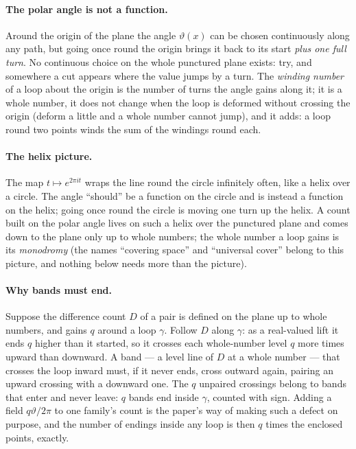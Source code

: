 \documentclass[10pt]{article}
\theoremstyle{plain}
\theoremstyle{definition}
\begin{document}
\paragraph{The polar angle is not a function.}
Around the origin of the plane the angle $\vartheta(x)$ can be chosen
continuously along any path, but going once round the origin brings it back
to its start \emph{plus one full turn}. No continuous choice on the whole
punctured plane exists: try, and somewhere a cut appears where the value
jumps by a turn. The \emph{winding number} of a loop about the origin is
the number of turns the angle gains along it; it is a whole number, it does
not change when the loop is deformed without crossing the origin (deform a
little and a whole number cannot jump), and it adds: a loop round two
points winds the sum of the windings round each.

\paragraph{The helix picture.}
The map $t\mapsto e^{2\pi it}$ wraps the line round the circle infinitely
often, like a helix over a circle. The angle ``should'' be a function on
the circle and is instead a function on the helix; going once round the
circle is moving one turn up the helix. A count built on the polar angle
lives on such a helix over the punctured plane and comes down to the plane
only up to whole numbers; the whole number a loop gains is its
\emph{monodromy} (the names ``covering space'' and ``universal cover''
belong to this picture, and nothing below needs more than the picture).

\paragraph{Why bands must end.}
Suppose the difference count $D$ of a pair is defined on the plane up to
whole numbers, and gains $q$ around a loop $\gamma$. Follow $D$ along
$\gamma$: as a real-valued lift it ends $q$ higher than it started, so it
crosses each whole-number level $q$ more times upward than downward. A
band --- a level line of $D$ at a whole number --- that crosses the loop
inward must, if it never ends, cross outward again, pairing an upward
crossing with a downward one. The $q$ unpaired crossings belong to bands
that enter and never leave: $q$ bands end inside $\gamma$, counted with
sign. Adding a field $q\vartheta/2\pi$ to one family's count is the
paper's way of making such a defect on purpose, and the number of endings
inside any loop is then $q$ times the enclosed points, exactly.
\end{document}
